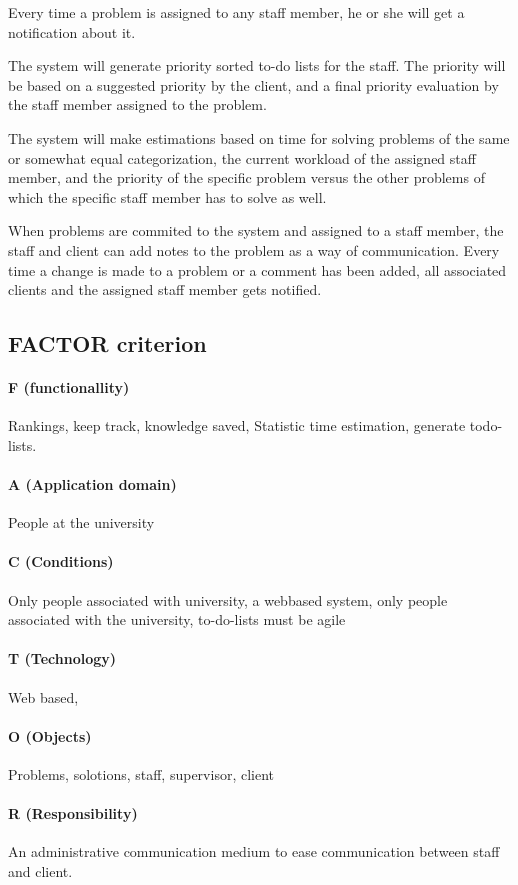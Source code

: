Every time a problem is assigned to any staff member, he or she will get a notification about it.

The system will generate priority sorted to-do lists for the staff. The priority will be based on a suggested priority by the client, and a final priority evaluation by the staff member assigned to the problem.

The system will make estimations based on time for solving problems of the same or somewhat equal categorization, the current workload of the assigned staff member, and the priority of the specific problem versus the other problems of which the specific staff member has to solve as well.

When problems are commited to the system and assigned to a staff member, the staff and client can add notes to the problem as a way of communication. Every time a change is made to a problem or a comment has been added, all associated clients and the assigned staff member gets notified.

\subsection{FACTOR criterion}
\label{sec:factor}


\paragraph{F (functionallity)} Rankings, keep track, knowledge saved, Statistic time estimation, generate todo-lists.

\paragraph{A (Application domain)} People at the university

\paragraph{C (Conditions)} Only people associated with university, a webbased system, only people associated with the university, to-do-lists must be agile

\paragraph{T (Technology)} Web based, 

\paragraph{O (Objects)} Problems, solotions, staff, supervisor, client

\paragraph{R (Responsibility)} An administrative communication medium to ease communication between staff and client.\\